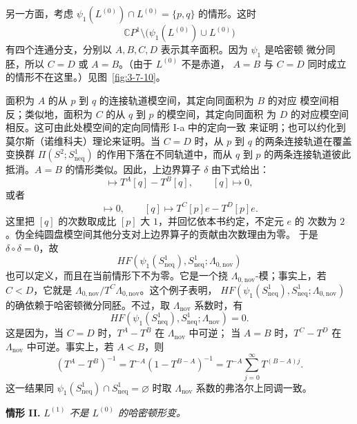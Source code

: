 另一方面，考虑
$\psi_1(L^{(0)})\cap L^{(0)}=\{p,q\}$ 的情形。这时
\[
 \mathbb CP^1\setminus
 \bigl(\psi_1(L^{(0)})\cup L^{(0)}\bigr)
\]
有四个连通分支，分别以 $A,B,C,D$ 表示其辛面积。因为 $\psi_1$ 是哈密顿
微分同胚，所以 $C=D$ 或 $A=B$。（由于 $L^{(0)}$ 不是赤道，
$A=B$ 与 $C=D$ 同时成立的情形不在这里。）见图~\ref{fig:3-7-10}。

面积为 $A$ 的从 $p$ 到 $q$ 的连接轨道模空间，其定向同面积为 $B$ 的对应
模空间相反；类似地，面积为 $C$ 的从 $q$ 到 $p$ 的模空间，其定向同面积
为 $D$ 的对应模空间相反。这可由此处模空间的定向同情形 I-a 中的定向一致
来证明；也可以约化到莫尔斯（诺维科夫）理论来证明。当 $C=D$ 时，从 $p$
到 $q$ 的两条连接轨道在覆盖变换群
$\Pi(S^2;S^1_{\mathrm{neq}})$ 的作用下落在不同轨道中，而从 $q$ 到 $p$
的两条连接轨道彼此抵消。$A=B$ 的情形类似。因此，上边界算子 $\delta$
由下式给出：
\begin{equation}
 [p]\longmapsto T^A[q]-T^B[q],
 \qquad
 [q]\longmapsto0,
\tag{3.7.84.1}\label{eq:3-7-84-1}
\end{equation}
或者
\begin{equation}
 [p]\longmapsto0,
 \qquad
 [q]\longmapsto T^C[p]e-T^D[p]e.
\tag{3.7.84.2}\label{eq:3-7-84-2}
\end{equation}
这里把 $[q]$ 的次数取成比 $[p]$ 大 $1$，并回忆依本书约定，不定元 $e$ 的
次数为 $2$。伪全纯圆盘模空间其他分支对上边界算子的贡献由次数理由为零。
于是 $\delta\circ\delta=0$，故
\[
 HF(\psi_1(S^1_{\mathrm{neq}}),S^1_{\mathrm{neq}};
 \Lambda_{0,\mathrm{nov}})
\]
也可以定义，而且在当前情形下不为零。它是一个挠
$\Lambda_{0,\mathrm{nov}}$-模；事实上，若 $C<D$，它就是
$\Lambda_{0,\mathrm{nov}}/T^C\Lambda_{0,\mathrm{nov}}$。这个例子表明，
$HF(\psi_1(S^1_{\mathrm{neq}}),S^1_{\mathrm{neq}};
\Lambda_{0,\mathrm{nov}})$ 的确依赖于哈密顿微分同胚。不过，取
$\Lambda_{\mathrm{nov}}$ 系数时，有
\begin{equation}
 HF(\psi_1(S^1_{\mathrm{neq}}),S^1_{\mathrm{neq}};
 \Lambda_{\mathrm{nov}})=0.
\tag{3.7.85}\label{eq:3-7-85}
\end{equation}
这是因为，当 $C=D$ 时，$T^A-T^B$ 在 $\Lambda_{\mathrm{nov}}$ 中可逆；
当 $A=B$ 时，$T^C-T^D$ 在 $\Lambda_{\mathrm{nov}}$ 中可逆。事实上，若
$A<B$，则
\[
 (T^A-T^B)^{-1}
 =T^{-A}(1-T^{B-A})^{-1}
 =T^{-A}\sum_{j=0}^{\infty}T^{(B-A)j}.
\]
这一结果同
$\psi_1(S^1_{\mathrm{neq}})\cap S^1_{\mathrm{neq}}=\varnothing$
时取 $\Lambda_{\mathrm{nov}}$ 系数的弗洛尔上同调一致。

\par\medskip
\noindent\textbf{情形 II.}\enspace
\textit{$L^{(1)}$ 不是 $L^{(0)}$ 的哈密顿形变。}

